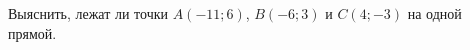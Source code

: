 \begin{ex}
	\begin{condition}
		Выяснить, лежат ли точки $A(-11;6)$, $B(-6;3)$ и $C(4;-3)$ на одной прямой.
	\end{condition}
\end{ex}